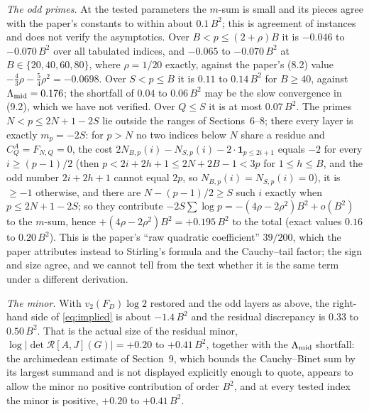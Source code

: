 \documentclass[11pt]{amsart}
\theoremstyle{definition}
\begin{document}
\emph{The odd primes.} At the tested parameters the $m$-sum is small and its pieces agree with the paper's
constants to within about $0.1\,B^2$; this is agreement of instances and does not verify the asymptotics. Over $B<p\le(2+\rho)B$ it is $-0.046$ to $-0.070\,B^2$ over all tabulated indices, and $-0.065$ to $-0.070\,B^2$ at $B\in\{20,40,60,80\}$, where $\rho=1/20$ exactly, against the paper's (8.2) value $-\tfrac43\rho-\tfrac54\rho^2=-0.0698$. Over $S<p\le B$ it is $0.11$ to $0.14\,B^2$ for $B\ge40$, against
$\Lambda_{\rm mid}=0.176$; the shortfall of $0.04$ to $0.06\,B^2$ may be the slow convergence in (9.2), which we have not verified. Over $Q\le S$ it is at most $0.07\,B^2$. The primes $N<p\le2N+1-2S$ lie outside the ranges of
Sections~6--8; there every layer is exactly $m_p=-2S$: for $p>N$ no two indices below $N$ share a residue and $C^A_Q=F_{N,Q}=0$, the cost $2N_{B,p}(i)-N_{S,p}(i)-2\cdot\mathbf 1_{p\le2i+1}$ equals $-2$ for every $i\ge(p-1)/2$ (then $p<2i+2h+1\le2N+2B-1<3p$ for $1\le h\le B$, and the odd number $2i+2h+1$ cannot equal $2p$, so $N_{B,p}(i)=N_{S,p}(i)=0$), it is $\ge-1$ otherwise, and there are $N-(p-1)/2\ge S$ such $i$ exactly when $p\le2N+1-2S$; so they contribute
$-2S\sum\log p=-(4\rho-2\rho^2)B^2+o(B^2)$ to the $m$-sum, hence $+(4\rho-2\rho^2)B^2=+0.195\,B^2$ to the total
(exact values $0.16$ to $0.20\,B^2$). This is the paper's ``raw quadratic coefficient'' $39/200$, which the paper
attributes instead to Stirling's formula and the Cauchy--tail factor; the sign and size agree, and we cannot tell
from the text whether it is the same term under a different derivation.

\emph{The minor.} With $v_2(F_D)\log2$ restored and the odd layers as above, the right-hand side of
\eqref{eq:implied} is about $-1.4\,B^2$ and the residual discrepancy is $0.33$ to $0.50\,B^2$. That is the actual
size of the residual minor, $\log|\det\mathcal R[A,J](G)|=+0.20$ to $+0.41\,B^2$, together with the
$\Lambda_{\rm mid}$ shortfall: the archimedean estimate of Section~9, which bounds the Cauchy--Binet sum by its
largest summand and is not displayed explicitly enough to quote, appears to allow the minor no positive contribution of order $B^2$, and at every tested index the minor is positive, $+0.20$ to $+0.41\,B^2$.
\end{document}
